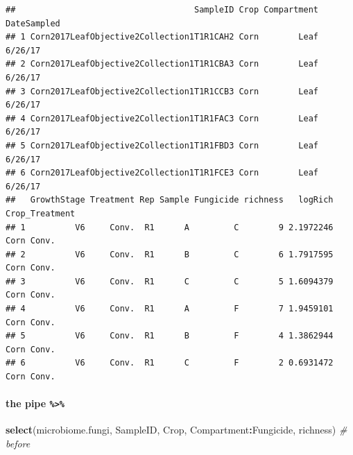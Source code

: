 \documentclass[
]{article}
\newenvironment{Shaded}{\begin{snugshade}}{\end{snugshade}}
\newcommand{\CommentTok}[1]{\textcolor[rgb]{0.56,0.35,0.01}{\textit{#1}}}
\newcommand{\FunctionTok}[1]{\textcolor[rgb]{0.13,0.29,0.53}{\textbf{#1}}}
\newcommand{\NormalTok}[1]{#1}
\newcommand{\SpecialCharTok}[1]{\textcolor[rgb]{0.81,0.36,0.00}{\textbf{#1}}}
\begin{document}
\begin{verbatim}
##                                    SampleID Crop Compartment DateSampled
## 1 Corn2017LeafObjective2Collection1T1R1CAH2 Corn        Leaf     6/26/17
## 2 Corn2017LeafObjective2Collection1T1R1CBA3 Corn        Leaf     6/26/17
## 3 Corn2017LeafObjective2Collection1T1R1CCB3 Corn        Leaf     6/26/17
## 4 Corn2017LeafObjective2Collection1T1R1FAC3 Corn        Leaf     6/26/17
## 5 Corn2017LeafObjective2Collection1T1R1FBD3 Corn        Leaf     6/26/17
## 6 Corn2017LeafObjective2Collection1T1R1FCE3 Corn        Leaf     6/26/17
##   GrowthStage Treatment Rep Sample Fungicide richness   logRich Crop_Treatment
## 1          V6     Conv.  R1      A         C        9 2.1972246     Corn Conv.
## 2          V6     Conv.  R1      B         C        6 1.7917595     Corn Conv.
## 3          V6     Conv.  R1      C         C        5 1.6094379     Corn Conv.
## 4          V6     Conv.  R1      A         F        7 1.9459101     Corn Conv.
## 5          V6     Conv.  R1      B         F        4 1.3862944     Corn Conv.
## 6          V6     Conv.  R1      C         F        2 0.6931472     Corn Conv.
\end{verbatim}

\paragraph{\texorpdfstring{the pipe
\texttt{\%\textgreater{}\%}}{the pipe \%\textgreater\%}}\label{the-pipe}

\begin{Shaded}
\begin{Highlighting}[]
\FunctionTok{select}\NormalTok{(microbiome.fungi, SampleID, Crop, Compartment}\SpecialCharTok{:}\NormalTok{Fungicide, richness) }\CommentTok{\# before}
\end{Highlighting}
\end{Shaded}
\end{document}
